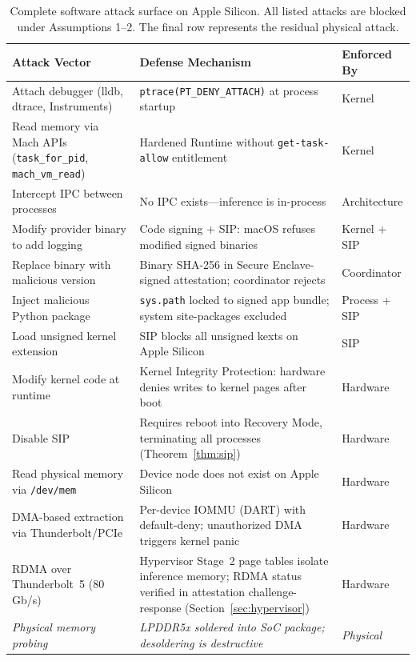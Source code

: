\documentclass[10pt,twocolumn,letterpaper]{article}
\begin{document}
\begin{table}[t]
\centering
\caption{Complete software attack surface on Apple Silicon. All listed attacks are blocked under Assumptions 1--2. The final row represents the residual physical attack.}
\label{tab:attacks}
\vspace{4pt}
\small
\begin{tabularx}{\textwidth}{@{}lXl@{}}
\toprule
\textbf{Attack Vector} & \textbf{Defense Mechanism} & \textbf{Enforced By} \\
\midrule
Attach debugger (lldb, dtrace, Instruments) & \texttt{ptrace(PT\_DENY\_ATTACH)} at process startup & Kernel \\
Read memory via Mach APIs (\texttt{task\_for\_pid}, \texttt{mach\_vm\_read}) & Hardened Runtime without \texttt{get-task-allow} entitlement & Kernel \\
Intercept IPC between processes & No IPC exists---inference is in-process & Architecture \\
Modify provider binary to add logging & Code signing + SIP: macOS refuses modified signed binaries & Kernel + SIP \\
Replace binary with malicious version & Binary SHA-256 in Secure Enclave-signed attestation; coordinator rejects & Coordinator \\
Inject malicious Python package & \texttt{sys.path} locked to signed app bundle; system site-packages excluded & Process + SIP \\
Load unsigned kernel extension & SIP blocks all unsigned kexts on Apple Silicon & SIP \\
Modify kernel code at runtime & Kernel Integrity Protection: hardware denies writes to kernel pages after boot & Hardware \\
Disable SIP & Requires reboot into Recovery Mode, terminating all processes (Theorem~\ref{thm:sip}) & Hardware \\
Read physical memory via \texttt{/dev/mem} & Device node does not exist on Apple Silicon & Hardware \\
DMA-based extraction via Thunderbolt/PCIe & Per-device IOMMU (DART) with default-deny; unauthorized DMA triggers kernel panic & Hardware \\
RDMA over Thunderbolt~5 (80\,Gb/s) & Hypervisor Stage~2 page tables isolate inference memory; RDMA status verified in attestation challenge-response (Section~\ref{sec:hypervisor}) & Hardware \\
\midrule
\textit{Physical memory probing} & \textit{LPDDR5x soldered into SoC package; desoldering is destructive} & \textit{Physical} \\
\bottomrule
\end{tabularx}
\end{table}
\end{document}
